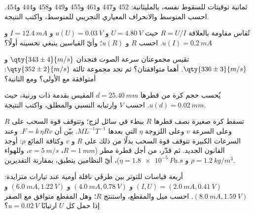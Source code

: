\begin{exercise}[$\star\star$]\label{exo:b1:units-dimensions:6}
ثمانية توقيتات للسقوط نفسه، بالمليثانية: $452$ و$447$ و$461$
و$455$ و$449$ و$458$ و$444$ و$454$. احسب المتوسط والانحراف المعياري
التجريبي  للمتوسط، واكتب النتيجة.
\end{exercise}

\begin{exercise}[$\star\star$]\label{exo:b1:units-dimensions:7}
تُقاس مقاومة بالعلاقة $R = U/I$ حيث $U = \qty{4.80}{V}$ و
$u(U) = \qty{0.03}{V}$ و $I = \qty{12.4}{mA}$ و $u(I) = \qty{0.2}{mA}$.
احسب $R$ و $u(R)$؛ وأيّ القياسين ينبغي تحسينه أولًا؟
\end{exercise}

\begin{exercise}[$\star\star$]\label{exo:b1:units-dimensions:8}
تقيس مجموعتان سرعة الصوت فتجدان $\qty{343\pm4}{m/s}$ و
$\qty{336\pm3}{m/s}$. أهما متوافقتان؟ ثم تجد مجموعة ثالثة
$\qty{352\pm2}{m/s}$: أمتوافقة مع الأولى؟ ومع الثانية؟
\end{exercise}

\begin{exercise}[$\star\star$]\label{exo:b1:units-dimensions:9}
يُحسب حجم كرة من قطرها $d = \qty{25.40}{mm}$ المقيس بقدمة ذات ورنية،
حيث $u(d) = \qty{0.02}{mm}$. احسب $V$ وارتيابه النسبي والمطلق، واكتب
النتيجة.
\end{exercise}

\begin{exercise}[$\star\star\star$]\label{exo:b1:units-dimensions:10}
تسقط كرة صغيرة نصف قطرها $R$ ببطء في سائل لزج؛ وتتوقف قوة السحب على
$R$ وعلى السرعة $v$ وعلى اللزوجة $\eta$ التي بعدها
$M L^{-1} T^{-1}$. بيّن أن $F = k\,\eta R v$. وعند السرعات الكبيرة
تتوقف قوة السحب بدلًا من ذلك على $R$ و $v$ وكثافة المائع $\rho$:
أوجد القانون الجديد. ثم قدّر، من أجل قطرة مطر ($R = \qty{1}{mm}$،
$v = \qty{5}{m/s}$، وللهواء $\rho = \qty{1.2}{kg/m^3}$ و
$\eta = \qty{1.8e-5}{Pa.s}$)، أيّ النظامين ينطبق، بمقارنة
التقديرين.
\end{exercise}

\begin{exercise}[$\star\star\star$]\label{exo:b1:units-dimensions:11}
أربعة قياسات للتوتر بين طرفَي ناقلة أومية عند تيارات متزايدة:
$(I, U) = (\qty{2.0}{mA}, \qty{0.41}{V})$ و $(\qty{4.0}{mA},
\qty{0.78}{V})$ و $(\qty{6.0}{mA}, \qty{1.22}{V})$ و $(\qty{8.0}{mA},
\qty{1.59}{V})$. احسب ميل  والمقطع، واستنتج
$R$؛ وهل المقطع متوافق مع الصفر إذا حمل كل $U$ ارتيابًا
$u = \qty{0.02}{V}$؟
\end{exercise}

